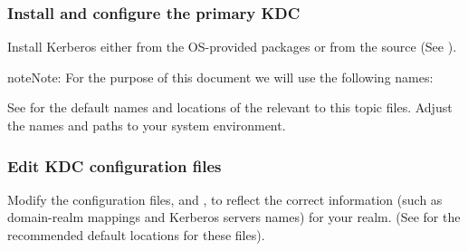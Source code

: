 \documentclass[letterpaper,10pt,english]{sphinxmanual}
\begin{document}
\subsubsection{Install and configure the primary KDC}
\label{\detokenize{admin/install_kdc:install-and-configure-the-primary-kdc}}
Install Kerberos either from the OS-provided packages or from the
source (See ).

\begin{sphinxadmonition}{note}{Note:}
For the purpose of this document we will use the following
names:

%
\begin{sphinxVerbatim}[commandchars=\\\{\}]
      
    
        
    
           
\end{sphinxVerbatim}

See {\hyperref[\detokenize{mitK5defaults:mitk5defaults}]{}} for the default names and locations
of the relevant to this topic files.  Adjust the names and
paths to your system environment.
\end{sphinxadmonition}


\subsubsection{Edit KDC configuration files}
\label{\detokenize{admin/install_kdc:edit-kdc-configuration-files}}
Modify the configuration files, {\hyperref[\detokenize{admin/conf_files/krb5_conf:krb5-conf-5}]{}} and
{\hyperref[\detokenize{admin/conf_files/kdc_conf:kdc-conf-5}]{}}, to reflect the correct information (such as
domain-realm mappings and Kerberos servers names) for your realm.
(See {\hyperref[\detokenize{mitK5defaults:mitk5defaults}]{}} for the recommended default locations for
these files).
\end{document}
